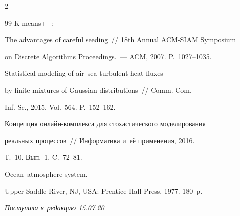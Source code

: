 \begin{multicols}{2}
{{\begin{thebibliography}{99}
 K-means++: 

The advantages of careful seeding~// 18th Annual ACM-SIAM Symposium 

on Discrete Algorithms Proceedings.~--- ACM, 2007. P.~1027--1035.





Statistical modeling of air--sea turbulent heat fluxes 

by finite mixtures of Gaussian distributions~// Comm. Com. 

Inf. Sc., 2015. Vol.~564. P.~152--162.





Концепция он\-лайн-комп\-лек\-са для стохастического моделирования 

реальных процессов~// Информатика и~её применения, 2016. 

Т.~10. Вып.~1. C.~72--81.




 Ocean--atmosphere system.~--- 

Upper Saddle River, NJ, USA: Prentice Hall Press, 1977. 180~p.

\end{thebibliography}



 }

 }



\end{multicols}



\vspace*{-6pt}



\hfill{\small\textit{Поступила в~редакцию 15.07.20}}



\vspace*{8pt}












